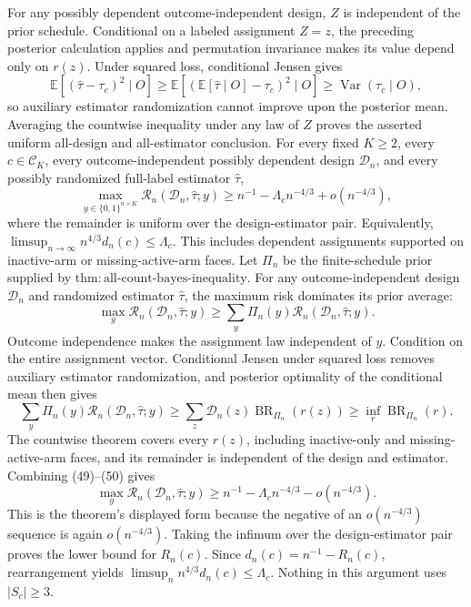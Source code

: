 For any possibly dependent outcome-independent design, \(Z\) is independent of the prior schedule.  Conditional on a labeled assignment \(Z=z\), the preceding posterior calculation applies and permutation invariance makes its value depend only on \(r(z)\).  Under squared loss, conditional Jensen gives
\[
\mathbb E[(\widehat\tau-\tau_c)^2\mid O]
\ge\mathbb E[(\mathbb E[\widehat\tau\mid O]-\tau_c)^2\mid O]
\ge\operatorname{Var}(\tau_c\mid O),
\]
so auxiliary estimator randomization cannot improve upon the posterior mean.  Averaging the countwise inequality under any law of \(Z\) proves the asserted uniform all-design and all-estimator conclusion.
For every fixed \(K\ge2\), every \(c\in\mathcal C_K\), every outcome-independent possibly dependent design \(\mathcal D_n\), and every possibly randomized full-label estimator \(\widehat\tau\),
\[
\max_{y\in\{0,1\}^{n\times K}}\mathcal R_n(\mathcal D_n,\widehat\tau;y)
\ge n^{-1}-\Lambda_cn^{-4/3}+o(n^{-4/3}),
\]
where the remainder is uniform over the design-estimator pair. Equivalently, \(\limsup_{n\to\infty}n^{4/3}d_n(c)\le\Lambda_c\).  This includes dependent assignments supported on inactive-arm or missing-active-arm faces.
Let \(\Pi_n\) be the finite-schedule prior supplied by \(\mathrm{thm:all\text{-}count\text{-}bayes\text{-}inequality}\).  For any outcome-independent design \(\mathcal D_n\) and randomized estimator \(\widehat\tau\), the maximum risk dominates its prior average:
\[
\max_y\mathcal R_n(\mathcal D_n,\widehat\tau;y)
\ge\sum_y\Pi_n(y)\mathcal R_n(\mathcal D_n,\widehat\tau;y).
\tag{49}
\]
Outcome independence makes the assignment law independent of \(y\).  Condition on the entire assignment vector.  Conditional Jensen under squared loss removes auxiliary estimator randomization, and posterior optimality of the conditional mean then gives
\[
\sum_y\Pi_n(y)\mathcal R_n(\mathcal D_n,\widehat\tau;y)
\ge\sum_z\mathcal D_n(z)\operatorname{BR}_{\Pi_n}(r(z))
\ge\inf_r\operatorname{BR}_{\Pi_n}(r).
\tag{50}
\]
The countwise theorem covers every \(r(z)\), including inactive-only and missing-active-arm faces, and its remainder is independent of the design and estimator.  Combining (49)--(50) gives
\[
\max_y\mathcal R_n(\mathcal D_n,\widehat\tau;y)
\ge n^{-1}-\Lambda_cn^{-4/3}-o(n^{-4/3}).
\]
This is the theorem's displayed form because the negative of an \(o(n^{-4/3})\) sequence is again \(o(n^{-4/3})\).  Taking the infimum over the design-estimator pair proves the lower bound for \(R_n(c)\).  Since \(d_n(c)=n^{-1}-R_n(c)\), rearrangement yields \(\limsup_n n^{4/3}d_n(c)\le\Lambda_c\).  Nothing in this argument uses \(|S_c|\ge3\).
